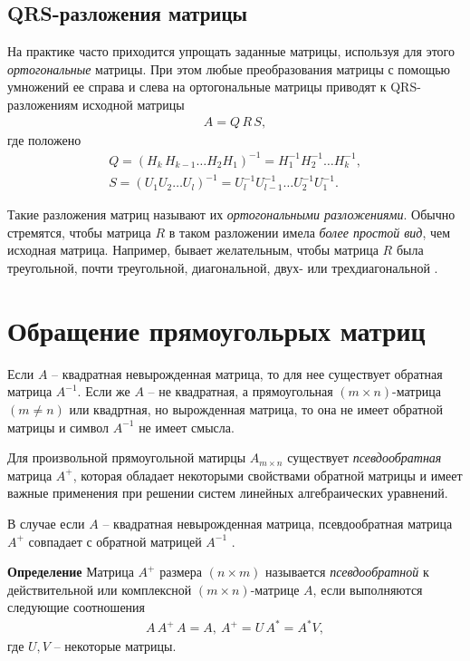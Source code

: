 \documentclass[%
	11pt,
	a4paper,
	utf8,
		]{article}
\begin{document}
\subsection{QRS-разложения матрицы}

На практике часто приходится упрощать заданные матрицы, используя для этого \emph{ортогональные} матрицы. При этом любые преобразования матрицы с помощью умножений ее справа и слева на ортогональные матрицы приводят к QRS-разложениям исходной матрицы
\begin{align*}
	A = Q \, R \, S,
\end{align*}
где положено
\begin{align*}
	Q = (H_k \, H_{k-1} \ldots H_2 H_1)^{-1} = H_1^{-1}H_2^{-1} \ldots H_k^{-1},\\
	S = (U_1U_2 \ldots U_l)^{-1} = U_l^{-1} U_{l-1}^{-1} \ldots U_2^{-1} U_1^{-1}.
\end{align*}

Такие разложения матриц называют их \emph{ортогональными разложениями}. Обычно стремятся, чтобы матрица $ R $ в таком разложении имела \emph{более простой вид}, чем исходная матрица. Например, бывает желательным, чтобы матрица $ R $ была треугольной, почти треугольной, диагональной, двух- или трехдиагональной \cite[]{shevtsov:linal-2012}.

\section{Обращение прямоугольрых матриц}

Если $ A $ -- квадратная невырожденная матрица, то для нее существует обратная матрица $ A^{-1} $. Если же $ A $ -- не квадратная, а прямоугольная $ (m \times n) $-матрица $ (m \neq n) $ или квадртная, но вырожденная матрица, то она не имеет обратной матрицы и символ $ A^{-1} $ не имеет смысла.

Для произвольной прямоугольной матирцы $ A_{m \times n} $ существует \emph{псевдообратная} матрица $ A^+ $, которая обладает некоторыми свойствами обратной матрицы и имеет важные применения при решении систем линейных алгебраических уравнений.

В случае если $ A $ -- квадратная невырожденная матрица, псевдообратная матрица $ A^+ $ совпадает с обратной матрицей $ A^{-1} $ \cite[]{shevtsov:linal-2012}.

\textbf{Определение} Матрица $ A^+ $ размера $ (n \times m) $ называется \emph{псевдообратной} к действительной или комплексной $ (m \times n) $-матрице $ A $, если выполняются следующие соотношения
\begin{align*}
	A \, A^+ \, A = A, \ A^+ = U \, A^* = A^* V,
\end{align*}
где $ U, V $ -- некоторые матрицы.
\end{document}
